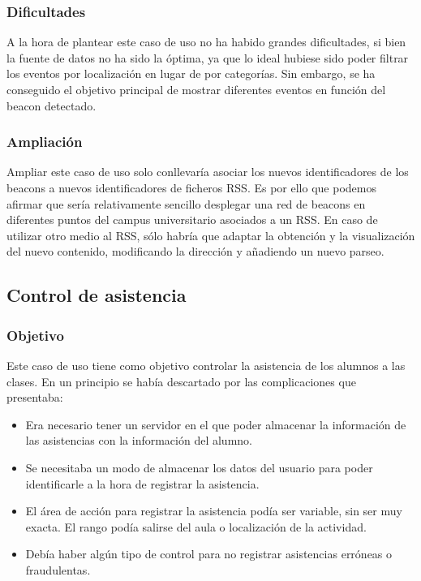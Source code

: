 \subsubsection{Dificultades}


A la hora de plantear este caso de uso no ha habido grandes dificultades, si bien la fuente de datos no ha sido la óptima, ya que lo ideal hubiese sido poder filtrar los eventos por localización en lugar de por categorías. Sin embargo, se ha conseguido el objetivo principal de mostrar diferentes eventos en función del beacon detectado.

\subsubsection{Ampliación}


Ampliar este caso de uso solo conllevaría asociar los nuevos identificadores de los beacons a nuevos identificadores de ficheros RSS. Es por ello que podemos afirmar que sería relativamente sencillo desplegar una red de beacons en diferentes puntos del campus universitario asociados a un RSS. En caso de utilizar otro medio al RSS, sólo habría que adaptar la obtención y la visualización del nuevo contenido, modificando la dirección y añadiendo un nuevo parseo.


\subsection{Control de asistencia}

\subsubsection{Objetivo}

Este caso de uso tiene como objetivo controlar la asistencia de los alumnos a las clases. En un principio se había descartado por las complicaciones que presentaba: 

\begin{itemize}
\item Era necesario tener un servidor en el que poder almacenar la información de las asistencias con la información del alumno.
\item Se necesitaba un modo de almacenar los datos del usuario para poder identificarle a la hora de registrar la asistencia.
\item El área de acción para registrar la asistencia podía ser variable, sin ser muy exacta. El rango podía salirse del aula o localización de la actividad.
\item Debía haber algún tipo de control para no registrar asistencias erróneas o fraudulentas.
\end{itemize}

